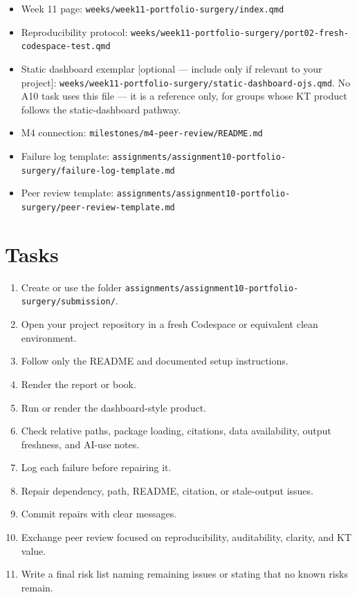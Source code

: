 \documentclass[
  letterpaper,
  DIV=11,
  numbers=noendperiod,
  oneside]{scrreprt}
\providecommand{\tightlist}{%
  \setlength{\itemsep}{0pt}\setlength{\parskip}{0pt}}
\begin{document}
\begin{itemize}
\tightlist
\item
  Week 11 page: \texttt{weeks/week11-portfolio-surgery/index.qmd}
\item
  Reproducibility protocol:
  \texttt{weeks/week11-portfolio-surgery/port02-fresh-codespace-test.qmd}
\item
  Static dashboard exemplar {[}optional --- include only if relevant to
  your project{]}:
  \texttt{weeks/week11-portfolio-surgery/static-dashboard-ojs.qmd}. No
  A10 task uses this file --- it is a reference only, for groups whose
  KT product follows the static-dashboard pathway.
\item
  M4 connection: \texttt{milestones/m4-peer-review/README.md}
\item
  Failure log template:
  \texttt{assignments/assignment10-portfolio-surgery/failure-log-template.md}
\item
  Peer review template:
  \texttt{assignments/assignment10-portfolio-surgery/peer-review-template.md}
\end{itemize}

\section{Tasks}\label{tasks-9}

\begin{enumerate}
\def\labelenumi{\arabic{enumi}.}
\tightlist
\item
  Create or use the folder
  \texttt{assignments/assignment10-portfolio-surgery/submission/}.
\item
  Open your project repository in a fresh Codespace or equivalent clean
  environment.
\item
  Follow only the README and documented setup instructions.
\item
  Render the report or book.
\item
  Run or render the dashboard-style product.
\item
  Check relative paths, package loading, citations, data availability,
  output freshness, and AI-use notes.
\item
  Log each failure before repairing it.
\item
  Repair dependency, path, README, citation, or stale-output issues.
\item
  Commit repairs with clear messages.
\item
  Exchange peer review focused on reproducibility, auditability,
  clarity, and KT value.
\item
  Write a final risk list naming remaining issues or stating that no
  known risks remain.
\end{enumerate}
\end{document}
